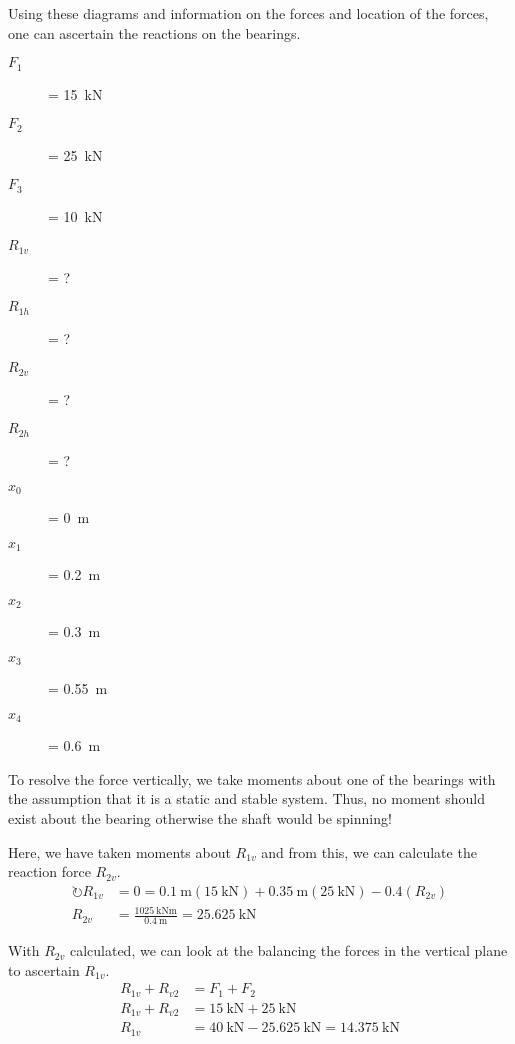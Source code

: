 Using these diagrams and information on the forces and location of the forces, one can ascertain the reactions on the bearings.

\begin{multicols}{3}
\begin{description}
  \item[$F_1$] = \SI{15}{\kilo\newton}
  \item[$F_2$] = \SI{25}{\kilo\newton}
  \item[$F_3$] = \SI{10}{\kilo\newton}
  \item[$R_{1v}$] = ?
  \item[$R_{1h}$] = ?
  \item[$R_{2v}$] = ?
  \item[$R_{2h}$] = ?
  \item[$x_0$] = \SI{0}{\metre}
  \item[$x_1$] = \SI{0.2}{\metre}
  \item[$x_2$] = \SI{0.3}{\metre}
  \item[$x_3$] = \SI{0.55}{\metre}
  \item[$x_4$] = \SI{0.6}{\metre}
\end{description}
\end{multicols}

To  resolve the force vertically, we take moments about one of the bearings with the assumption that it is a static and stable system. Thus, no moment should exist about the bearing otherwise the shaft would be spinning!

Here, we have taken moments about $R_{1v}$ and from this, we can calculate the reaction force $R_{2v}$. 
\begin{align}
  \circlearrowright R_{1v} &= 0 = \SI{0.1}{\metre}(\SI{15}{\kilo\newton}) + \SI{0.35}{\metre}(\SI{25}{\kilo\newton}) - 0.4(R_{2v}) \\
  R_{2v} &= \frac{\SI{1025}{\kilo\newton\metre}}{\SI{0.4}{\metre}} = \SI{25.625}{\kilo\newton}
\end{align}

With $R_{2v}$ calculated, we can look at the balancing the forces in the vertical plane to ascertain $R_{1v}$.
\begin{align}
  R_{1v}+R_{v2}&=F_1+F_2\\
  R_{1v}+R_{v2}&=\SI{15}{\kilo\newton}+\SI{25}{\kilo\newton}\\
  R_{1v} &= \SI{40}{\kilo\newton}-\SI{25.625}{\kilo\newton} = \SI{14.375}{\kilo\newton}
\end{align}

